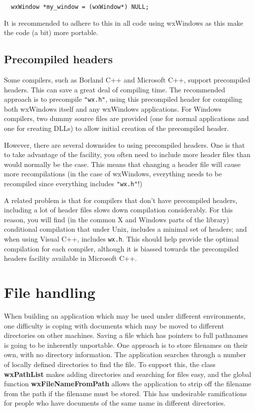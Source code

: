 {\small
\begin{verbatim}
  wxWindow *my_window = (wxWindow*) NULL;
\end{verbatim}
}

It is recommended to adhere to this in all code using wxWindows as
this make the code (a bit) more portable.

\subsection{Precompiled headers}

Some compilers, such as Borland C++ and Microsoft C++, support
precompiled headers. This can save a great deal of compiling time. The
recommended approach is to precompile {\tt "wx.h"}, using this
precompiled header for compiling both wxWindows itself and any
wxWindows applications. For Windows compilers, two dummy source files
are provided (one for normal applications and one for creating DLLs)
to allow initial creation of the precompiled header.

However, there are several downsides to using precompiled headers. One
is that to take advantage of the facility, you often need to include
more header files than would normally be the case. This means that
changing a header file will cause more recompilations (in the case of
wxWindows, everything needs to be recompiled since everything includes {\tt "wx.h"}!)

A related problem is that for compilers that don't have precompiled
headers, including a lot of header files slows down compilation
considerably. For this reason, you will find (in the common
X and Windows parts of the library) conditional
compilation that under Unix, includes a minimal set of headers;
and when using Visual C++, includes {\tt wx.h}. This should help provide
the optimal compilation for each compiler, although it is
biassed towards the precompiled headers facility available
in Microsoft C++.

\section{File handling}

When building an application which may be used under different
environments, one difficulty is coping with documents which may be
moved to different directories on other machines. Saving a file which
has pointers to full pathnames is going to be inherently unportable. One
approach is to store filenames on their own, with no directory
information.  The application searches through a number of locally
defined directories to find the file. To support this, the class {\bf
wxPathList} makes adding directories and searching for files easy, and
the global function {\bf wxFileNameFromPath} allows the application to
strip off the filename from the path if the filename must be stored.
This has undesirable ramifications for people who have documents of the
same name in different directories.

